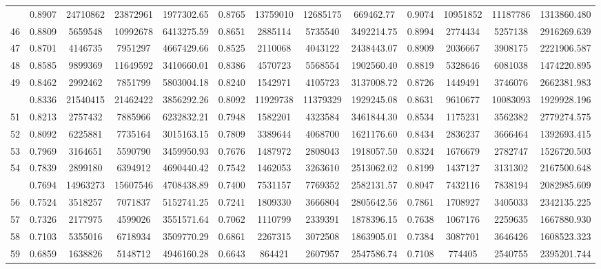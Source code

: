 \documentclass[
  12pt,
]{article}
\begin{document}
\begin{longtable}[t]{lcccccccccccc}
\addlinespace
45 & 0.8907 & 24710862 & 23872961 & 1977302.65 & 0.8765 & 13759010 & 12685175 & 669462.77 & 0.9074 & 10951852 & 11187786 & 1313860.480\\
46 & 0.8809 & 5659548 & 10992678 & 6413275.59 & 0.8651 & 2885114 & 5735540 & 3492214.75 & 0.8994 & 2774434 & 5257138 & 2916269.639\\
47 & 0.8701 & 4146735 & 7951297 & 4667429.66 & 0.8525 & 2110068 & 4043122 & 2438443.07 & 0.8909 & 2036667 & 3908175 & 2221906.587\\
48 & 0.8585 & 9899369 & 11649592 & 3410660.01 & 0.8386 & 4570723 & 5568554 & 1902560.40 & 0.8819 & 5328646 & 6081038 & 1474220.895\\
49 & 0.8462 & 2992462 & 7851799 & 5803004.18 & 0.8240 & 1542971 & 4105723 & 3137008.72 & 0.8726 & 1449491 & 3746076 & 2662381.983\\
\addlinespace
50 & 0.8336 & 21540415 & 21462422 & 3856292.26 & 0.8092 & 11929738 & 11379329 & 1929245.08 & 0.8631 & 9610677 & 10083093 & 1929928.196\\
51 & 0.8213 & 2757432 & 7885966 & 6232832.21 & 0.7948 & 1582201 & 4323584 & 3461844.30 & 0.8534 & 1175231 & 3562382 & 2779274.575\\
52 & 0.8092 & 6225881 & 7735164 & 3015163.15 & 0.7809 & 3389644 & 4068700 & 1621176.60 & 0.8434 & 2836237 & 3666464 & 1392693.415\\
53 & 0.7969 & 3164651 & 5590790 & 3459950.93 & 0.7676 & 1487972 & 2808043 & 1918057.50 & 0.8324 & 1676679 & 2782747 & 1526720.503\\
54 & 0.7839 & 2899180 & 6394912 & 4690440.42 & 0.7542 & 1462053 & 3263610 & 2513062.02 & 0.8199 & 1437127 & 3131302 & 2167500.648\\
\addlinespace
55 & 0.7694 & 14963273 & 15607546 & 4708438.89 & 0.7400 & 7531157 & 7769352 & 2582131.57 & 0.8047 & 7432116 & 7838194 & 2082985.609\\
56 & 0.7524 & 3518257 & 7071837 & 5152741.25 & 0.7241 & 1809330 & 3666804 & 2805642.56 & 0.7861 & 1708927 & 3405033 & 2342135.225\\
57 & 0.7326 & 2177975 & 4599026 & 3551571.64 & 0.7062 & 1110799 & 2339391 & 1878396.15 & 0.7638 & 1067176 & 2259635 & 1667880.930\\
58 & 0.7103 & 5355016 & 6718934 & 3509770.29 & 0.6861 & 2267315 & 3072508 & 1863905.01 & 0.7384 & 3087701 & 3646426 & 1608523.323\\
59 & 0.6859 & 1638826 & 5148712 & 4946160.28 & 0.6643 & 864421 & 2607957 & 2547586.74 & 0.7108 & 774405 & 2540755 & 2395201.744\\

\end{longtable}
\end{document}
